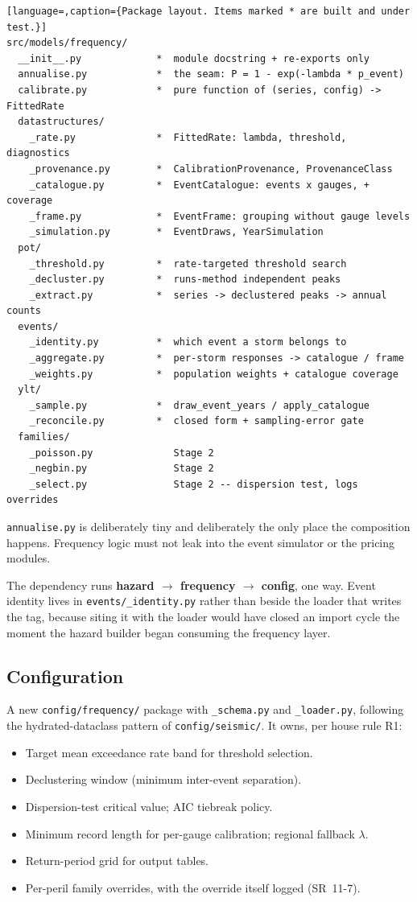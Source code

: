 \documentclass[11pt]{article}
\begin{document}
\begin{lstlisting}[language=,caption={Package layout. Items marked * are built and under test.}]
src/models/frequency/
  __init__.py             *  module docstring + re-exports only
  annualise.py            *  the seam: P = 1 - exp(-lambda * p_event)
  calibrate.py            *  pure function of (series, config) -> FittedRate
  datastructures/
    _rate.py              *  FittedRate: lambda, threshold, diagnostics
    _provenance.py        *  CalibrationProvenance, ProvenanceClass
    _catalogue.py         *  EventCatalogue: events x gauges, + coverage
    _frame.py             *  EventFrame: grouping without gauge levels
    _simulation.py        *  EventDraws, YearSimulation
  pot/
    _threshold.py         *  rate-targeted threshold search
    _decluster.py         *  runs-method independent peaks
    _extract.py           *  series -> declustered peaks -> annual counts
  events/
    _identity.py          *  which event a storm belongs to
    _aggregate.py         *  per-storm responses -> catalogue / frame
    _weights.py           *  population weights + catalogue coverage
  ylt/
    _sample.py            *  draw_event_years / apply_catalogue
    _reconcile.py         *  closed form + sampling-error gate
  families/
    _poisson.py              Stage 2
    _negbin.py               Stage 2
    _select.py               Stage 2 -- dispersion test, logs overrides
\end{lstlisting}

\noindent \texttt{annualise.py} is deliberately tiny and deliberately the only
place the composition happens. Frequency logic must not leak into the event
simulator or the pricing modules.

The dependency runs \textbf{hazard $\rightarrow$ frequency $\rightarrow$
config}, one way. Event identity lives in \texttt{events/\_identity.py} rather
than beside the loader that writes the tag, because siting it with the loader
would have closed an import cycle the moment the hazard builder began consuming
the frequency layer.

\subsection{Configuration}

A new \texttt{config/frequency/} package with \texttt{\_schema.py} and
\texttt{\_loader.py}, following the hydrated-dataclass pattern of
\texttt{config/seismic/}. It owns, per house rule R1:

\begin{itemize}[nosep]
  \item Target mean exceedance rate band for threshold selection.
  \item Declustering window (minimum inter-event separation).
  \item Dispersion-test critical value; AIC tiebreak policy.
  \item Minimum record length for per-gauge calibration; regional fallback
        $\lambda$.
  \item Return-period grid for output tables.
  \item Per-peril family overrides, with the override itself logged (SR~11-7).
\end{itemize}
\end{document}
